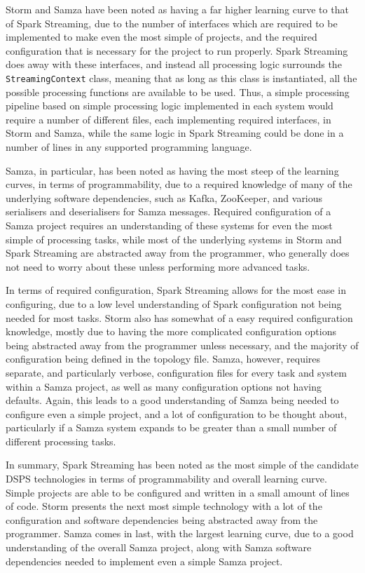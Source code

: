 Storm and Samza have been noted as having a far higher learning curve to that of Spark Streaming, due to the number of
interfaces which are required to be implemented to make even the most simple of projects, and the required configuration
that is necessary for the project to run properly. Spark Streaming does away with these interfaces, and instead all processing
logic surrounds the \texttt{StreamingContext} class, meaning that as long as this class is instantiated, all the possible processing
functions are available to be used. Thus, a simple processing pipeline based on simple processing logic implemented in each
system would require a number of different files, each implementing required interfaces, in Storm and Samza, while the
same logic in Spark Streaming could be done in a number of lines in any supported programming language.

Samza, in particular, has been noted as having the most steep of the learning curves, in terms of programmability, due
to a required knowledge of many of the underlying software dependencies, such as Kafka, ZooKeeper, and various serialisers
and deserialisers for Samza messages. Required configuration of a Samza project requires an understanding of these systems for
even the most simple of processing tasks, while most of the underlying systems in Storm and Spark Streaming are abstracted
away from the programmer, who generally does not need to worry about these unless performing more advanced tasks.

In terms of required configuration, Spark Streaming allows for the most ease in configuring, due to a low level understanding
of Spark configuration not being needed for most tasks. Storm also has somewhat of a easy required configuration knowledge,
mostly due to having the more complicated configuration options being abstracted away from the programmer unless necessary, and the
majority of configuration being defined in the topology file. Samza, however, requires separate, and particularly verbose,
configuration files for every task and system within a Samza project, as well as many configuration options not having
defaults. Again, this leads to a good understanding of Samza being needed to configure even a simple project, and a lot
of configuration to be thought about, particularly if a Samza system expands to be greater than a small number of different
processing tasks.

In summary, Spark Streaming has been noted as the most simple of the candidate DSPS technologies in terms of programmability
and overall learning curve. Simple projects are able to be configured and written in a small amount of lines of code.
Storm presents the next most simple technology with a lot of the configuration and software dependencies being abstracted
away from the programmer. Samza comes in last, with the largest learning curve, due to a good understanding of the overall
Samza project, along with Samza software dependencies needed to implement even a simple Samza project.


